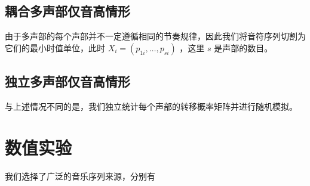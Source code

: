\documentclass[11pt]{article}
\begin{document}
\subsection{耦合多声部仅音高情形}
由于多声部的每个声部并不一定遵循相同的节奏规律，因此我们将音符序列切割为它们的最小时值单位，此时 $X_i=(p_{1i}, \dots, p_{si})$ ，这里 $s$ 是声部的数目。
\subsection{独立多声部仅音高情形}
与上述情况不同的是，我们独立统计每个声部的转移概率矩阵并进行随机模拟。

\section{数值实验}
我们选择了广泛的音乐序列来源，分别有
\end{document}
